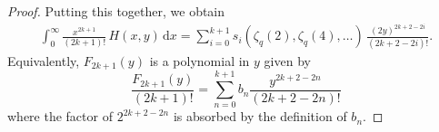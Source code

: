 \documentclass[10pt,a4paper]{amsart}
\newcommand{\dd}{\mathrm{d}}
\begin{document}
\begin{proof}
Putting this together, we obtain
\begin{align*}
\int_0^\infty \!\! \frac{x^{2k+1}}{(2k+1)!} \, H(x,y) \, \dd x %
=\sum_{i=0}^{k+1} s_i ( \zeta_q(2), \zeta_q(4), \ldots) \, \frac{(2y)^{2k+2-2i}}{(2k+2-2i)!}.
\end{align*}
Equivalently, $F_{2k+1}(y)$ is a polynomial in $y$ given by
\[
\frac{F_{2k+1}(y)}{(2k+1)!}=\sum_{n=0}^{k+1} b_n\frac{y^{2k+2-2n}}{(2k+2-2n)!} 
\]
where the factor of $2^{2k+2-2n}$ is absorbed by the definition of $b_n$.
\end{proof}
\end{document}
